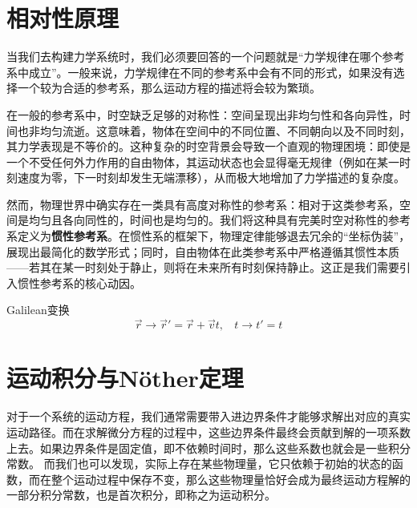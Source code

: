 \section{相对性原理}
\label{sec:Galilean}
当我们去构建力学系统时，我们必须要回答的一个问题就是“力学规律在哪个参考系中成立”。一般来说，力学规律在不同的参考系中会有不同的形式，如果没有选择一个较为合适的参考系，那么运动方程的描述将会较为繁琐。

在一般的参考系中，时空缺乏足够的对称性：空间呈现出非均匀性和各向异性，时间也非均匀流逝。这意味着，物体在空间中的不同位置、不同朝向以及不同时刻，其力学表现是不等价的。这种复杂的时空背景会导致一个直观的物理困境：即使是一个不受任何外力作用的自由物体，其运动状态也会显得毫无规律（例如在某一时刻速度为零，下一时刻却发生无端漂移），从而极大地增加了力学描述的复杂度。

然而，物理世界中确实存在一类具有高度对称性的参考系：相对于这类参考系，空间是均匀且各向同性的，时间也是均匀的。我们将这种具有完美时空对称性的参考系定义为\textbf{惯性参考系}。在惯性系的框架下，物理定律能够退去冗余的“坐标伪装”，展现出最简化的数学形式；同时，自由物体在此类参考系中严格遵循其惯性本质——若其在某一时刻处于静止，则将在未来所有时刻保持静止。这正是我们需要引入惯性参考系的核心动因。

Galilean变换
\begin{equation}
    \vec{r} \rightarrow \vec{r}'= \vec{r} +\vec{v}t,~~~~t \rightarrow t' = t
\end{equation}

\begin{figure}[h]
    
\end{figure}



\section{运动积分与N\"other定理}
\label{sec:noether_theo}
对于一个系统的运动方程，我们通常需要带入进边界条件才能够求解出对应的真实运动路径。而在求解微分方程的过程中，这些边界条件最终会贡献到解的一项系数上去。如果边界条件是固定值，即不依赖时间时，那么这些系数也就会是一些积分常数。
而我们也可以发现，实际上存在某些物理量，它只依赖于初始的状态的函数，而在整个运动过程中保存不变，那么这些物理量恰好会成为最终运动方程解的一部分积分常数，也是首次积分，即称之为运动积分。

